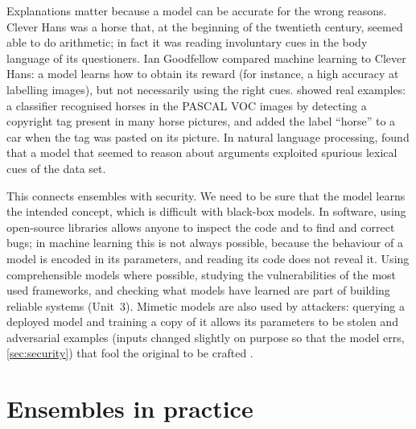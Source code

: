 Explanations matter because a model can be accurate for the wrong reasons. Clever Hans was a
horse that, at the beginning of the twentieth century, seemed able to do arithmetic; in fact it
was reading involuntary cues in the body language of its questioners. Ian Goodfellow compared
machine learning to Clever Hans: a model learns how to obtain its reward (for instance, a high
accuracy at labelling images), but not necessarily using the right cues. \citet{lapuschkin2019unmasking}
showed real examples: a classifier recognised horses in the PASCAL VOC images by detecting a
copyright tag present in many horse pictures, and added the label ``horse'' to a car when the tag
was pasted on its picture. In natural language processing, \citet{niven2019probing} found that a model that seemed to reason about
arguments exploited spurious lexical cues of the data set.

This connects ensembles with security. We need to be sure that the model learns the intended
concept, which is difficult with black-box models. In software, using open-source libraries
allows anyone to inspect the code and to find and correct bugs; in machine learning this is not
always possible, because the behaviour of a model is encoded in its parameters, and reading its code does not reveal it. Using
comprehensible models where possible, studying the vulnerabilities of the most used frameworks,
and checking what models have learned are part of building reliable systems (Unit~3). Mimetic
models are also used by attackers: querying a deployed model and training a copy of it allows
its parameters to be stolen \citep{tramer2016stealing} and adversarial examples (inputs changed slightly on purpose so that the model errs, \cref{sec:security}) that fool the
original to be crafted \citep{papernot2017practical}.

\section{Ensembles in practice}\label{sec:enspractice}

